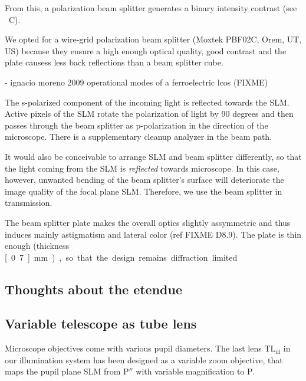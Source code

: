 From this, a polarization beam splitter generates a binary intensity
contrast (see ~C). 

We opted for a wire-grid polarization beam splitter (Moxtek PBF02C,
Orem, UT, US) because they ensure a high enough optical quality, good
contrast and the plate causess less back reflections than a beam
splitter cube.


- ignacio moreno 2009 operational modes of a ferroelectric lcos
(FIXME)

The s-polarized component of the incoming light is reflected towards
the SLM. Active pixels of the SLM rotate the polarization of light by
90 degrees and then passes through the beam splitter as p-polarization
in the direction of the microscope. There is a supplementary cleanup
analyzer in the beam path. 

It would also be conceivable to arrange SLM and beam splitter
differently, so that the light coming from the SLM is \emph{reflected}
towards microscope. In this case, however, unwanted bending of the
beam splitter's surface will deteriorate the image quality of the
focal plane SLM. Therefore, we use the beam splitter in transmission.


The beam splitter plate makes the overall optics slightly assymmetric
and thus induces mainly astigmatism and lateral color (ref FIXME
D8.9). The plate is thin enough (thickness \unit[0.7]{mm}), so that
the design remains diffraction limited.

 	
	  	

\subsection{Thoughts about the etendue}

\subsection{ Variable telescope as tube lens}
Microscope objectives come with various pupil diameters. The last lens
$\textrm{TL}_\textrm{ill}$ in our illumination system has been
designed as a variable zoom objective, that maps the pupil plane SLM
from $\textrm{P}''$ with variable magnification to $\textrm{P}$.

